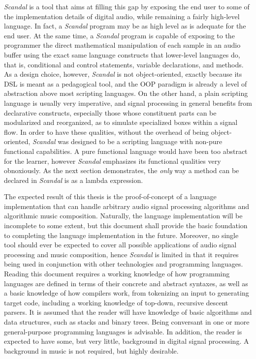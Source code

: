 \emph{Scandal} is a tool that aims at filling this gap by exposing the end user to some of the implementation details of digital audio, while remaining a fairly high-level language. In fact, a \emph{Scandal} program may be as high level as is adequate for the end user. At the same time, a \emph{Scandal} program is capable of exposing to the programmer the direct mathematical manipulation of each sample in an audio buffer using the exact same language constructs that lower-level languages do, that is, conditional and control statements, variable declarations, and methods. As a design choice, however, \emph{Scandal} is not object-oriented, exactly because its DSL is meant as a pedagogical tool, and the OOP paradigm is already a level of abstraction above most scripting languages. On the other hand, a plain scripting language is usually very imperative, and signal processing in general benefits from declarative constructs, especially those whose constituent parts can be modularized and reorganized, as to simulate specialized boxes within a signal flow. In order to have these qualities, without the overhead of being object-oriented, \emph{Scandal} was designed to be a scripting language with non-pure functional capabilities. A pure functional language would have been too abstract for the learner, however \emph{Scandal} emphasizes its functional qualities very obnoxiously. As the next section demonstrates, the \emph{only} way a method can be declared in \emph{Scandal} is as a lambda expression.

The expected result of this thesis is the proof-of-concept of a language implementation that can handle arbitrary audio signal processing algorithms and algorithmic music composition. Naturally, the language implementation will be incomplete to some extent, but this document shall provide the basic foundation to completing the language implementation in the future. Moreover, no single tool should ever be expected to cover all possible applications of audio signal processing and music composition, hence \emph{Scandal} is limited in that it requires being used in conjunction with other technologies and programming languages. Reading this document requires a working knowledge of how programming languages are defined in terms of their concrete and abstract syntaxes, as well as a basic knowledge of how compilers work, from tokenizing an input to generating target code, including a working knowledge of top-down, recursive descent parsers. It is assumed that the reader will have knowledge of basic algorithms and data structures, such as stacks and binary trees. Being conversant in one or more general-purpose programming languages is advisable. In addition, the reader is expected to have some, but very little, background in digital signal processing. A background in music is not required, but highly desirable.


